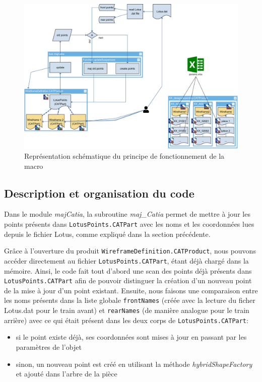 \begin{figure}
    \centering
    \includegraphics[width=\linewidth]{img/schemaAll.pdf}
    \caption{Représentation schématique du principe de fonctionnement de la macro}
    \label{fig:idea}
\end{figure}

\subsection{Description et organisation du code} %

\par Dans le module \textit{majCatia}, la subroutine \textit{maj\_Catia} permet de mettre à jour les points présents dans  \texttt{LotusPoints.CATPart} avec les noms et les coordonnées lues depuis le fichier Lotus, comme expliqué dans la section précédente. 

\par Grâce à l'ouverture du produit \texttt{WireframeDefinition.CATProduct}, nous pouvons accéder directement au fichier \texttt{LotusPoints.CATPart}, étant déjà chargé dans la mémoire.
Ainsi, le code fait tout d'abord une scan des points déjà présents dans \texttt{LotusPoints.CATPart} afin de pouvoir distinguer la création d'un nouveau point de la mise à jour d'un point existant. Ensuite, nous faisons une comparaison entre les noms présents dans la liste globale \texttt{frontNames} (créée avec la lecture du ficher Lotus.dat pour le train avant) et \texttt{rearNames} (de manière analogue pour le train arrière) avec ce qui était présent dans les deux corps de \texttt{LotusPoints.CATPart}:
\begin{itemize}
    \item si le point existe déjà, ses coordonnées sont mises à jour en passant par les paramètres de l'objet
    \item sinon, un nouveau point est créé en utilisant la méthode \textit{hybridShapeFactory} et ajouté dans l'arbre de la pièce
\end{itemize}



